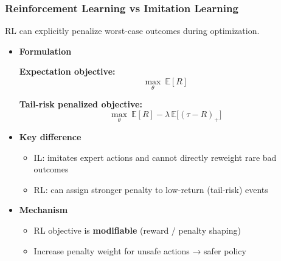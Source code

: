 \documentclass[11pt,aspectratio=169,xcolor={dvipsnames},usepdftitle=false]{beamer}
\begin{document}
\begin{frame}
\frametitle{Reinforcement Learning vs Imitation Learning}
RL can explicitly penalize worst-case outcomes during optimization.
\begin{itemize}
	\item \textbf{Formulation}

	\textbf{Expectation objective:}
	\vspace{-1.2em}
	$$
	\max_\theta \ \mathbb{E}[R]
	$$

	\textbf{Tail-risk penalized objective:}
	\vspace{-1.2em}
	$$
	\max_\theta \ \mathbb{E}[R]-\lambda\,\mathbb{E}\big[(\tau-R)_+\big]
	$$

	\item \textbf{Key difference}

	\begin{itemize}
		\item IL: imitates expert actions and cannot directly reweight rare bad outcomes
		\item RL: can assign stronger penalty to low-return (tail-risk) events
	\end{itemize}

	\item \textbf{Mechanism}

	\begin{itemize}
		\item RL objective is \textbf{modifiable} (reward / penalty shaping)
		\item Increase penalty weight for unsafe actions → safer policy
	\end{itemize}

\end{itemize}

\end{frame}
\end{document}
